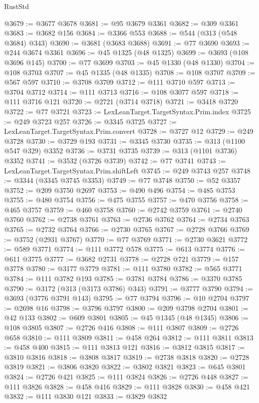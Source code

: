 \begin{lexlean}{RustStd}
\begin{coremodule}
@3679 := @3677 @3678
@3681 := @95 @3679 @3361
@3682 := @309 @3361
@3683 := @3682 @156
@3684 := @3366 @553
@3688 := @544 (@313 (@548 @3684) @343)
@3690 := @3681 (@3683 @3688)
@3691 := @77 @3690
@3693 := @244 @3674 @3361
@3696 := @45 @1325 (@48 @1325)
@3699 := @3693 (@108 @3696 @145)
@3700 := @77 @3699
@3703 := @45 @1330 (@48 @1330)
@3704 := @108 @3703
@3707 := @45 @1335 (@48 @1335)
@3708 := @108 @3707
@3709 := @567 @597
@3710 := @3708 @3709
@3712 := @111 @3710 @597
@3713 := @3704 @3712
@3714 := @111 @3713
@3716 := @108 @3077 @597
@3718 := @111 @3716 @121
@3720 := @2721 (@3714 @3718)
@3721 := @3418 @3720
@3722 := @77 @3721
@3723 := LexLeanTarget.TargetSyntax.Prim.index
@3725 := @249 @3723 @257
@3726 := @3345 @3725
@3727 := LexLeanTarget.TargetSyntax.Prim.convert
@3728 := @3727 @12
@3729 := @249 @3728
@3730 := @3729 @193
@3731 := @3345 @3730
@3735 := @313 (@1100 @547 @329) @3352
@3736 := @3731 @3735
@3739 := @313 (@1101 @3736) @3352
@3741 := @3532 (@3726 @3739)
@3742 := @77 @3741
@3743 := LexLeanTarget.TargetSyntax.Prim.shiftLeft
@3745 := @249 @3743 @257
@3748 := @3344 (@3345 @3745 @3353)
@3749 := @77 @3748
@3750 := @52 @3357
@3752 := @209 @3750 @2697
@3753 := @490 @496
@3754 := @485 @3753
@3755 := @480 @3754
@3756 := @475 @3755
@3757 := @470 @3756
@3758 := @465 @3757
@3759 := @460 @3758
@3760 := @2742 @3759
@3761 := @2740 @3760
@3762 := @2738 @3761
@3763 := @2736 @3762
@3764 := @2734 @3763
@3765 := @2732 @3764
@3766 := @2730 @3765
@3767 := @2728 @3766
@3769 := @3752 (@2931 @3767)
@3770 := @77 @3769
@3771 := @2730 @3621
@3772 := @589 @3771
@3774 := @111 @3772 @578
@3775 := @613 @3774
@3776 := @611 @3775
@3777 := @3682 @2731
@3778 := @2728 @721
@3779 := @157 @3778
@3780 := @3177 @3779
@3781 := @111 @3780
@3782 := @565 @3771
@3784 := @111 @3782 @193
@3785 := @3781 @3784
@3786 := @3370 @3785
@3790 := @3172 (@313 (@3173 @3786) @343)
@3791 := @3777 @3790
@3794 := @3693 (@3776 @3791 @143)
@3795 := @77 @3794
@3796 := @10 @2704
@3797 := @2698 @16
@3798 := @3796 @3797
@3800 := @209 @3798 @2704
@3801 := @42 @133
@3802 := @609 @3801
@3805 := @45 @1345 (@48 @1345)
@3806 := @108 @3805
@3807 := @2726 @416
@3808 := @111 @3807
@3809 := @2726 @658
@3810 := @111 @3809
@3811 := @458 @264
@3812 := @111 @3811
@3813 := @458 @400
@3815 := @111 @3813 @121
@3816 := @3812 @3815
@3817 := @3810 @3816
@3818 := @3808 @3817
@3819 := @2738 @3818
@3820 := @2728 @3819
@3821 := @3806 @3820
@3822 := @3802 @3821
@3823 := @645 @3801
@3824 := @2726 @421
@3825 := @111 @3824
@3826 := @2726 @448
@3827 := @111 @3826
@3828 := @458 @416
@3829 := @111 @3828
@3830 := @458 @421
@3832 := @111 @3830 @121
@3833 := @3829 @3832

\end{coremodule}
\end{lexlean}
